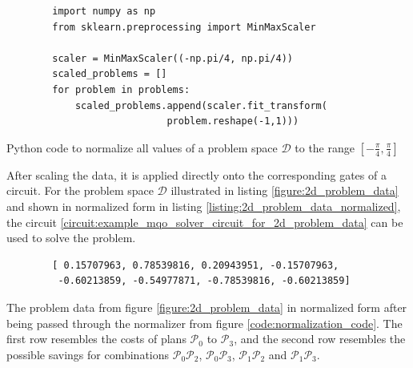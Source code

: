 \clearpage

\begin{listing}[!h]
    \centering
    \begin{verbatim}
        import numpy as np
        from sklearn.preprocessing import MinMaxScaler
        
        scaler = MinMaxScaler((-np.pi/4, np.pi/4))
        scaled_problems = []
        for problem in problems:
            scaled_problems.append(scaler.fit_transform(
                            problem.reshape(-1,1)))
    \end{verbatim}
    \caption{Python code to normalize all values of a problem space $\mathcal{D}$ to the range $\left[-\frac{\pi}{4},\frac{\pi}{4}\right]$}
    \label{code:normalization_code}
\end{listing}

After scaling the data, it is applied directly onto the corresponding gates of a circuit. For the problem space $\mathcal{D}$ illustrated in listing \ref{figure:2d_problem_data} and shown in normalized form in listing \ref{listing:2d_problem_data_normalized}, the circuit \ref{circuit:example_mqo_solver_circuit_for_2d_problem_data} can be used to solve the problem.

\begin{listing}[!ht]
    \centering
    \begin{verbatim}
        [ 0.15707963, 0.78539816, 0.20943951, -0.15707963,
         -0.60213859, -0.54977871, -0.78539816, -0.60213859]
    \end{verbatim}
    \caption{The problem data from figure \ref{figure:2d_problem_data} in normalized form after being passed through the normalizer from figure \ref{code:normalization_code}. The first row resembles the costs of plans $\mathcal{P}_0$ to $\mathcal{P}_3$, and the second row resembles the possible savings for combinations $\mathcal{P}_0\mathcal{P}_2$, $\mathcal{P}_0\mathcal{P}_3$, $\mathcal{P}_1\mathcal{P}_2$ and $\mathcal{P}_1\mathcal{P}_3$.}
    \label{listing:2d_problem_data_normalized}
\end{listing}

